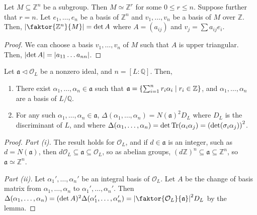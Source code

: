 \begin{lemma}
    Let \( M \subseteq \mathbb Z^n \) be a subgroup.
    Then \( M \simeq \mathbb Z^r \) for some \( 0 \leq r \leq n \).
    Suppose further that \( r = n \).
    Let \( e_1, \dots, e_n \) be a basis of \( \mathbb Z^n \) and \( v_1, \dots, v_n \) be a basis of \( M \) over \( \mathbb Z \).
    Then, \( \abs{\faktor{\mathbb Z^n}{M}} = \det A \) where \( A = (a_{ij}) \) and \( v_j = \sum a_{ij} e_i \).
\end{lemma}
\begin{proof}
    We can choose a basis \( v_1, \dots, v_n \) of \( M \) such that \( A \) is upper triangular.
    Then, \( \abs{\det A} = \abs{a_{11} \dots a_{nn}} \).
\end{proof}
\begin{lemma}
    Let \( \mathfrak a \triangleleft \mathcal O_L \) be a nonzero ideal, and \( n = [L : \mathbb Q] \).
    Then,
    \begin{enumerate}
        \item There exist \( \alpha_1, \dots, \alpha_n \in \mathfrak a \) such that \( \mathfrak a = \qty{\sum_{i=1}^n r_i \alpha_i \mid r_i \in \mathbb Z} \), and \( \alpha_1, \dots, \alpha_n \) are a basis of \( L / \mathbb Q \).
        \item For any such \( \alpha_1, \dots, \alpha_n \in \mathfrak a \), \( \Delta(\alpha_1, \dots, \alpha_n) = N(\mathfrak a)^2 D_L \) where \( D_L \) is the discriminant of \( L \), and where \( \Delta(\alpha_1, \dots, \alpha_n) = \det \Tr(\alpha_i \alpha_j) = \qty(\det (\sigma_i \alpha_j))^2 \).
    \end{enumerate}
\end{lemma}
\begin{proof}
    \emph{Part (i).}
    The result holds for \( \mathcal O_L \), and if \( d \in \mathfrak a \) is an integer, such as \( d = N(\mathfrak a) \), then \( d\mathcal O_L \subseteq \mathfrak a \subseteq \mathcal O_L \), so as abelian groups, \( (d\mathbb Z)^n \subseteq \mathfrak a \subseteq \mathbb Z^n \), so \( \mathfrak a \simeq \mathbb Z^n \).

    \emph{Part (ii).}
    Let \( \alpha_1', \dots, \alpha_n' \) be an integral basis of \( \mathcal O_L \).
    Let \( A \) be the change of basis matrix from \( \alpha_1, \dots, \alpha_n \) to \( \alpha_1', \dots, \alpha_n' \).
    Then \( \Delta(\alpha_1, \dots, \alpha_n) = (\det A)^2 \Delta(\alpha_1', \dots, \alpha_n') = \abs{\faktor{\mathcal O_L}{\mathfrak a}}^2 D_L \) by the lemma.
\end{proof}
